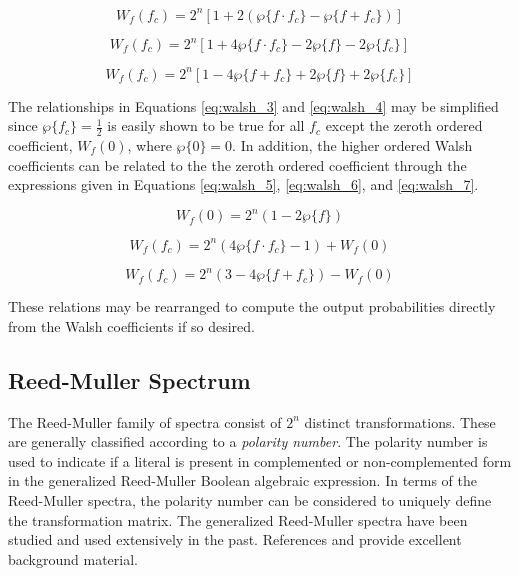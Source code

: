 \begin{equation}
W_f(f_c) = 2^n [1+2 (\wp \{f \cdot f_c \} - \wp \{f+f_c \} ) ]  \label{eq:walsh_2}
\end{equation}

\begin{equation}
W_f(f_c) = 2^n[1+4 \wp \{f \cdot f_c \} - 2 \wp \{f \} - 2 \wp \{f_c \}] \label{eq:walsh_3}
\end{equation}

\begin{equation}
W_f(f_c) = 2^n[1-4 \wp \{f + f_c \} + 2 \wp \{f \} + 2 \wp \{f_c \}] \label{eq:walsh_4}
\end{equation}

The relationships in Equations \ref{eq:walsh_3} and \ref{eq:walsh_4} may be simplified 
since $\wp \{ f_c \} = \frac{1}{2}$ is easily shown to be true for all $f_c$ except
the zeroth ordered coefficient, $W_f(0)$, where $\wp \{ 0 \} = 0$.  In addition, the 
higher ordered Walsh coefficients can be related to the the zeroth ordered coefficient
through the expressions given in Equations \ref{eq:walsh_5},  \ref{eq:walsh_6}, and
\ref{eq:walsh_7}.

\begin{equation}
W_f(0) = 2^n ( 1 - 2 \wp \{ f \} )     \label{eq:walsh_5}
\end{equation}

\begin{equation}
W_f(f_c) = 2^n ( 4 \wp \{ f \cdot f_c \} - 1) + W_f(0)    \label{eq:walsh_6}
\end{equation}

\begin{equation}
W_f(f_c) = 2^n ( 3 - 4 \wp \{ f + f_c \} ) - W_f(0)    \label{eq:walsh_7}
\end{equation}

These relations may be rearranged to compute the output probabilities directly from
the Walsh coefficients if so desired.

\subsection{Reed-Muller Spectrum}
The Reed-Muller family of spectra consist of $2^n$ distinct transformations.
These are generally classified according to a {\em polarity number}.  The polarity
number is used to indicate if a literal is present in complemented or non-complemented
form in the generalized Reed-Muller Boolean algebraic expression. In terms of the
Reed-Muller spectra, the polarity number can be considered to uniquely define the
transformation matrix.  The generalized Reed-Muller spectra have been studied
and used extensively in the past.  References \cite{DDT78} and \cite{DG86} provide
excellent background material.


